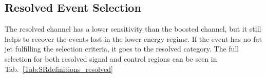 \subsection{Resolved Event Selection}
The resolved channel has a lower sensitivity than the boosted channel, but it still helps to recover the events lost in the lower energy regime. If the event has no fat jet fulfilling the selection criteria, it goes to the resolved category. The full selection for both resolved signal and control regions can be seen in Tab.~\ref{Tab:SRdefinitions_resolved}
\begin{table}[t]
	\caption{Summary of the selection criteria of of the  the resolved analysis for the $WW$ and $WZ$ signal regions (SR), $W$+jets control region (WR) and $ t\bar{t}$ control region (TR). } \label{Tab:SRdefinitions_resolved}
	\begin{center}
\end{center}
\end{table}
